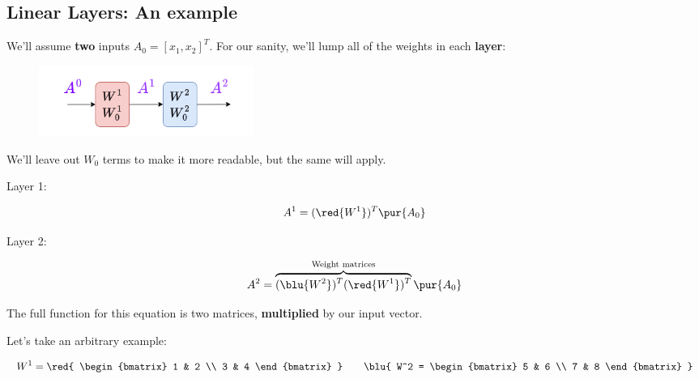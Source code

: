     \subsection{Linear Layers: An example}
        
        We'll assume \textbf{two} inputs $A_0 = [x_1, x_2]^T$. For our sanity, we'll lump all of the weights in each \textbf{layer}:
        
        \begin{figure}[H]
            \centering
            \includegraphics[width=70mm,scale=0.4]{images/nn_images/two_layer_linear_layer_view.png}
        \end{figure}
        
        We'll leave out $W_0$ terms to make it more readable, but the same will apply. 
        
        Layer 1:
        
        \begin{equation}
            A^1 = (\red{W^1})^T \pur{A_0} 
        \end{equation}
        
        Layer 2:
        
        \begin{equation}
            A^2 = 
            \overbrace{
            (\blu{W^2})^T (\red{W^1})^T
            }^{\text{Weight matrices}}
            \pur{A_0} 
        \end{equation}
        
        The full function for this equation is two matrices, \textbf{multiplied} by our input vector.
        
        Let's take an arbitrary example:
        
        \begin{equation}
            W^1 = 
            \red{
            \begin{bmatrix}
                1 & 2 \\ 3 & 4
            \end{bmatrix}
            }
            \qquad
            \blu{
            W^2 = 
            \begin{bmatrix}
                5 & 6 \\ 7 & 8
            \end{bmatrix}
            }
        \end{equation}
        

